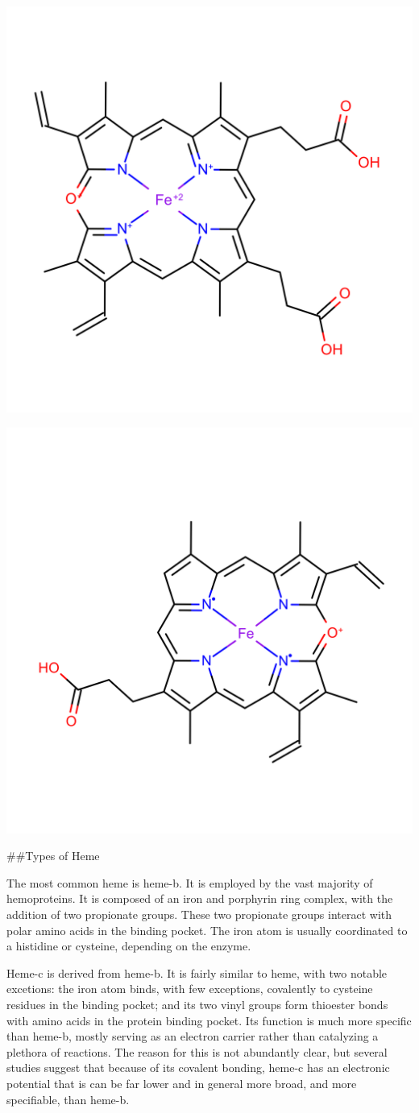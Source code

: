 \documentclass[a4paper, nobind]{templates/ociamthesis}
\let\origfigure\figure
\let\endorigfigure\endfigure
\renewenvironment{figure}[1][2] {
    \expandafter\origfigure\expandafter[H]
} {
    \endorigfigure
}
\begin{document}
\begin{figure}

{\centering \includegraphics[width=0.5\linewidth]{figures/VEA} 

}

\caption{Verdoheme, VEA}\label{fig:structVEA}
\end{figure}
\begin{figure}

{\centering \includegraphics[width=0.5\linewidth]{figures/VER} 

}

\caption{Verdoheme, VER}\label{fig:structVER}
\end{figure}

\#\#Types of Heme

The most common heme is heme-b. It is employed by the vast majority of hemoproteins. It is composed of an iron and porphyrin ring complex, with the addition of two propionate groups. These two propionate groups interact with polar amino acids in the binding pocket. The iron atom is usually coordinated to a histidine or cysteine, depending on the enzyme.

Heme-c is derived from heme-b. It is fairly similar to heme, with two notable excetions: the iron atom binds, with few exceptions, covalently to cysteine residues in the binding pocket; and its two vinyl groups form thioester bonds with amino acids in the protein binding pocket. Its function is much more specific than heme-b, mostly serving as an electron carrier rather than catalyzing a plethora of reactions. The reason for this is not abundantly clear, but several studies suggest that because of its covalent bonding, heme-c has an electronic potential that is can be far lower and in general more broad, and more specifiable, than heme-b. \autocite{Bowman2008,Kleingardner2015}
\end{document}
